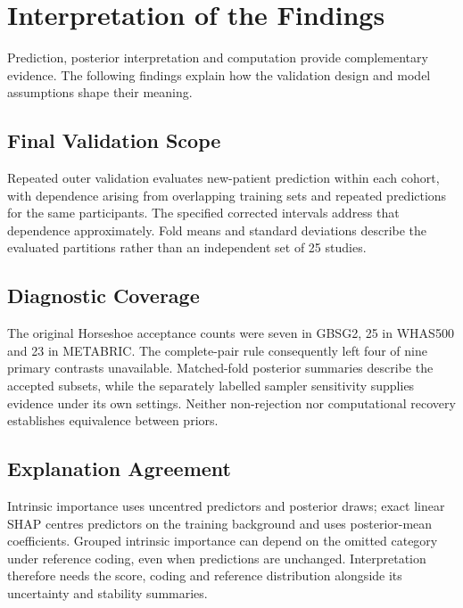 \section{Interpretation of the Findings}\label{limitations-of-the-research}

Prediction, posterior interpretation and computation provide complementary evidence. The following findings explain how the validation design and model assumptions shape their meaning.

\subsection{Final Validation Scope}\label{final-validation-scope}

Repeated outer validation evaluates new-patient prediction within each cohort, with dependence arising from overlapping training sets and repeated predictions for the same participants. The specified corrected intervals address that dependence approximately. Fold means and standard deviations describe the evaluated partitions rather than an independent set of 25 studies.

\subsection{Diagnostic Coverage}\label{incomplete-model-matrix}

The original Horseshoe acceptance counts were seven in GBSG2, 25 in WHAS500 and 23 in METABRIC. The complete-pair rule consequently left four of nine primary contrasts unavailable. Matched-fold posterior summaries describe the accepted subsets, while the separately labelled sampler sensitivity supplies evidence under its own settings. Neither non-rejection nor computational recovery establishes equivalence between priors.

\subsection{Explanation Agreement}\label{shap-boundary}

Intrinsic importance uses uncentred predictors and posterior draws; exact linear SHAP centres predictors on the training background and uses posterior-mean coefficients. Grouped intrinsic importance can depend on the omitted category under reference coding, even when predictions are unchanged. Interpretation therefore needs the score, coding and reference distribution alongside its uncertainty and stability summaries.

